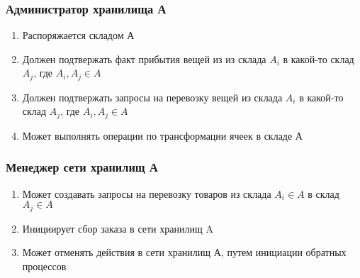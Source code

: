 \subsubsection{Администратор хранилища А}
\begin{enumerate}
  \item Распоряжается складом А
  
  \item Должен подтвержать факт прибытия вещей 
        из из склада $A_i$ в какой-то склад $A_j$, 
        где $A_i, A_j \in A$

  \item Должен подтвержать запросы на 
        перевозку вещей из склада $A_i$
        в какой-то склад $A_j$, где $A_i, A_j \in A$

  \item Может выполнять операции по 
        трансформации ячеек в складе А
\end{enumerate}


\subsubsection{Менеджер сети хранилищ А}
\begin{enumerate}
  \item Может создавать запросы на перевозку
        товаров из склада $A_i \in A$ в склад $A_j \in A$

  \item Инициирует сбор заказа в сети хранилищ A
  
  \item Может отменять действия в сети хранилищ А,
        путем инициации обратных процессов
\end{enumerate}
